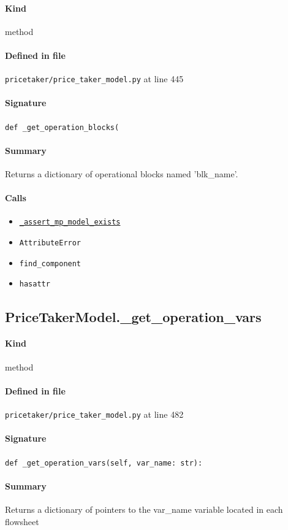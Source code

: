 \documentclass[11pt]{report}
\begin{document}
\paragraph{Kind} method
\paragraph{Defined in file} \texttt{pricetaker/price\_taker\_model.py} at line 445
\paragraph{Signature} \texttt{def \_get\_operation\_blocks(}
\paragraph{Summary} Returns a dictionary of operational blocks named 'blk\_name'.
\paragraph{Calls}
\begin{itemize}[leftmargin=*]
  \item \hyperref[def:pricetaker-price_taker_model.py:PriceTakerModel._assert_mp_model_exists:L283]{\texttt{\_assert\_mp\_model\_exists}}
  \item \texttt{AttributeError}
  \item \texttt{find\_component}
  \item \texttt{hasattr}
\end{itemize}
\subsection{PriceTakerModel.\_get\_operation\_vars}
\label{def:pricetaker-price_taker_model.py:PriceTakerModel._get_operation_vars:L482}
\paragraph{Kind} method
\paragraph{Defined in file} \texttt{pricetaker/price\_taker\_model.py} at line 482
\paragraph{Signature} \texttt{def \_get\_operation\_vars(self, var\_name: str):}
\paragraph{Summary} Returns a dictionary of pointers to the var\_name variable located in each flowsheet
\end{document}
